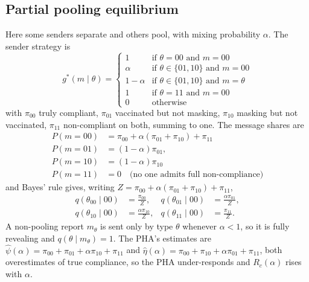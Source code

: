 \documentclass[sigconf,review]{acmart}
\begin{document}
\subsection{Partial pooling equilibrium}
\label{supp:equilibrium-pooling}
Here some senders separate and others pool, with mixing probability $\alpha$. The sender
strategy is
\begin{equation}
    g^*(m\mid \theta) =
\begin{cases}
1 & \text{if } \theta = 00 \text{ and } m = 00 \\
\alpha & \text{if } \theta \in \{01,10\} \text{ and } m = 00 \\
1-\alpha & \text{if } \theta \in \{01,10\} \text{ and } m = \theta \\
1 & \text{if } \theta = 11 \text{ and } m = 00 \\
0 & \text{otherwise}
\end{cases}
\end{equation}
with $\pi_{00}$ truly compliant, $\pi_{01}$ vaccinated but not masking, $\pi_{10}$ masking
but not vaccinated, $\pi_{11}$ non-compliant on both, summing to one. The message shares
are
\begin{equation}
\begin{aligned}
P(m = 00) &= \pi_{00} + \alpha(\pi_{01} + \pi_{10}) + \pi_{11}\\
P(m = 01) &= (1 - \alpha)\pi_{01},\\
P(m = 10) &= (1 - \alpha)\pi_{10}\\
P(m = 11) &= 0 \quad \text{(no one admits full non-compliance)}
\end{aligned}
\end{equation}
and Bayes' rule gives, writing $Z=\pi_{00}+\alpha(\pi_{01}+\pi_{10})+\pi_{11}$,
\begin{equation}
\begin{aligned}
q(\theta_{00}\mid 00)&=\tfrac{\pi_{00}}{Z},
& q(\theta_{01}\mid 00)&=\tfrac{\alpha\pi_{01}}{Z},\\
q(\theta_{10}\mid 00)&=\tfrac{\alpha\pi_{10}}{Z},
& q(\theta_{11}\mid 00)&=\tfrac{\pi_{11}}{Z}.
\end{aligned}
\label{eq:bayes-pool}
\end{equation}
A non-pooling report $m_\theta$ is sent only by type $\theta$ whenever $\alpha<1$, so it is
fully revealing and $q(\theta\mid m_\theta)=1$. The PHA's estimates are
$\hat\psi(\alpha)=\pi_{00}+\pi_{01}+\alpha\pi_{10}+\pi_{11}$ and
$\hat\eta(\alpha)=\pi_{00}+\pi_{10}+\alpha\pi_{01}+\pi_{11}$, both overestimates of true
compliance, so the PHA under-responds and $R_c(\alpha)$ rises with $\alpha$.
\end{document}

